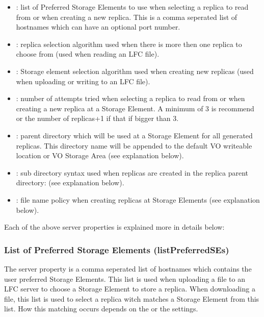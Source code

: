 \begin{itemize}
\item {} : list of Preferred Storage Elements to
use when selecting a replica to read from or when creating a new replica. This
is a comma seperated list of hostnames which can have an optional port number. 
\item {} : replica selection algorithm used when
there is more then one replica to choose from (used when reading an
LFC file).
\item {} : Storage element selection algorithm
used when creating new replicas (used when uploading or writing to an LFC file). 
\item {} : number of attempts tried when selecting a
replica to read from or when creating a new replica at a Storage Element. A
minimum of 3 is recommend or the number of replicas+1 if that if bigger than 3.     
\item {} : parent directory which will be used
at a Storage Element for all generated replicas. This directory name will be
appended to the default VO writeable location or VO Storage Area (see
explanation below).
\item {} : sub directory syntax used when
replicas are created in the replica parent directory: 
(see explanation below).
\item {} : file name policy when creating replicas at
Storage Elements (see explanation below). 
\end{itemize}

Each of the above server properties is explained more in details below: 

\subsubsection{List of Preferred Storage Elements (listPreferredSEs) } 

The server property  is a comma seperated list of
hostnames which contains the user preferred Storage Elements. 
This list is used when uploading a file to an LFC server to choose a
Storage Element to store a replica.  
When downloading a file, this list is used to select a replica witch matches a
Storage Element from this list. How this matching occurs depends on 
the  or the  settings.    

